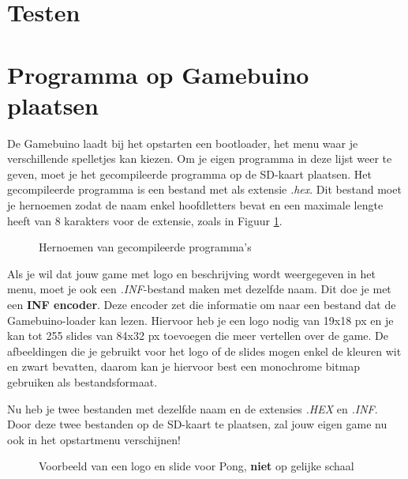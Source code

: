 \documentclass[a4paper,titlepage,12pt]{article}
\begin{document}
	\newpage
	\section{Testen}
	
	\section{Programma op Gamebuino plaatsen}
	De Gamebuino laadt bij het opstarten een bootloader, het menu waar je verschillende spelletjes kan kiezen. Om je eigen programma in deze lijst weer te geven, moet je het gecompileerde programma op de SD-kaart plaatsen. Het gecompileerde programma is een bestand met als extensie \emph{.hex}. Dit bestand moet je hernoemen zodat de naam enkel hoofdletters bevat en een maximale lengte heeft van 8 karakters voor de extensie, zoals in Figuur \ref{fig:hernoemen}.
	\begin{figure}[h]
		\centering
		\caption{\label{fig:hernoemen}Hernoemen van gecompileerde programma's}
	\end{figure}
	
	Als je wil dat jouw game met logo en beschrijving wordt weergegeven in het menu, moet je ook een \emph{.INF}-bestand maken met dezelfde naam. Dit doe je met een \textbf{INF encoder}\cite{GitHub:Rodot:InfEncoder}. Deze encoder zet die informatie om naar een bestand dat de Gamebuino-loader kan lezen. Hiervoor heb je een logo nodig van 19x18 px en je kan tot 255 slides van 84x32 px toevoegen die meer vertellen over de game. De afbeeldingen die je gebruikt voor het logo of de slides mogen enkel de kleuren wit en zwart bevatten, daarom kan je hiervoor best een monochrome bitmap gebruiken als bestandsformaat.
	
	Nu heb je twee bestanden met dezelfde naam en de extensies \emph{.HEX} en \emph{.INF}. Door deze twee bestanden op de SD-kaart te plaatsen, zal jouw eigen game nu ook in het opstartmenu verschijnen!
	
	\begin{figure}[h]
		\centering
		\caption{\label{fig:logo_slide}Voorbeeld van een logo en slide voor Pong, \textbf{niet} op gelijke schaal}
	\end{figure}
	
	\newpage
	
	
\end{document}
